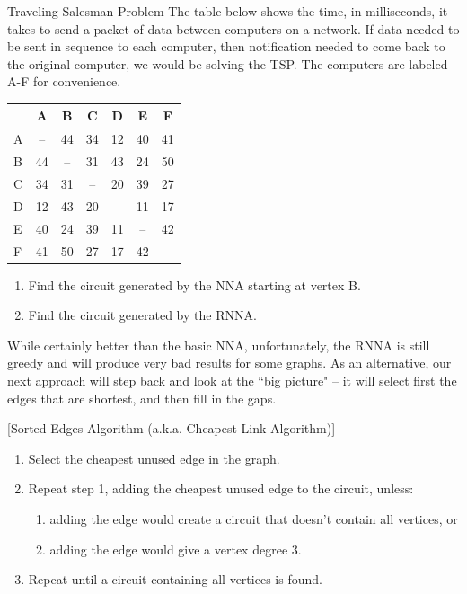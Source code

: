 \begin{ex}{Traveling Salesman Problem}{}
The table below shows the time, in milliseconds, it takes to send a packet of data between computers on a network.  If data needed to be sent in sequence to each computer, then notification needed to come back to the original computer, we would be solving the TSP. The computers are labeled A-F for convenience. 
\begin{center}
\begin{tabular}{|l|c|c|c|c|c|c|}
\hline
&A&B&C&D&E&F\\
\hline
A&--&44&34&12&40&41\\
\hline
B&44&--&31&43&24&50\\
\hline 
C&34&31&--&20&39&27\\
\hline
D&12&43&20&--&11&17\\
\hline
E&40&24&39&11&--&42\\
\hline
F&41&50&27&17&42&--\\
\hline
\end{tabular}
\par{}\label{tab:graphtheory-dor1-tab07}%

\end{center}

\begin{enumerate}[label=\alph*.]
\item	Find the circuit generated by the NNA starting at vertex B.
\item	Find the circuit generated by the RNNA.
\end{enumerate}
\end{ex}

While certainly better than the basic NNA, unfortunately, the RNNA is still greedy and will produce very bad results for some graphs.  As an alternative, our next approach will step back and look at the ``big picture" -- it will select first the edges that are shortest, and then fill in the gaps.

\begin{algorithm}{}{}[Sorted Edges Algorithm (a.k.a. Cheapest Link Algorithm)]
\hspace{3in}
\begin{enumerate}
\item Select the cheapest unused edge in the graph.
\item Repeat step 1, adding the cheapest unused edge to the circuit, unless:
\begin{enumerate}
\item adding the edge would create a circuit that doesn't contain all vertices, or
\item adding the edge would give a vertex degree 3.
\end{enumerate}
\item Repeat until a circuit containing all vertices is found.
\end{enumerate}
\end{algorithm}

